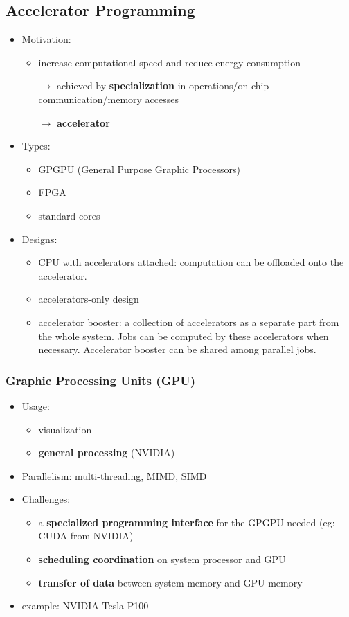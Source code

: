 \subsection{Accelerator Programming}
\begin{itemize}
	\item Motivation: 
	\begin{itemize}
		\item increase computational speed and reduce energy consumption
		
		$\rightarrow$ achieved by \textbf{specialization} in operations/on-chip communication/memory accesses
		
		$\rightarrow$ \textbf{accelerator}
	\end{itemize}
	\item Types:
	\begin{itemize}
		\item GPGPU (General Purpose Graphic Processors)
		\item FPGA
		\item standard cores
	\end{itemize}
	\item Designs:
	\begin{itemize}
		\item CPU with accelerators attached: computation can be offloaded onto the accelerator.
		\item accelerators-only design
		\item accelerator booster: a collection of accelerators as a separate part from the whole system. Jobs can be computed by these accelerators when necessary. Accelerator booster can be shared among parallel jobs.
	\end{itemize}
	
\end{itemize}

\subsubsection{Graphic Processing Units (GPU)}
\begin{itemize}
	\item Usage: 
	\begin{itemize}
		\item visualization
		\item \textbf{general processing} (NVIDIA)
	\end{itemize}
	\item Parallelism: multi-threading, MIMD, SIMD
	\item Challenges:
	\begin{itemize}
		\item a \textbf{specialized programming interface} for the GPGPU needed (eg: CUDA from NVIDIA)
		\item \textbf{scheduling coordination} on system processor and GPU
		\item \textbf{transfer of data} between system memory and GPU memory
	\end{itemize} 
	\item example: NVIDIA Tesla P100
\end{itemize}

